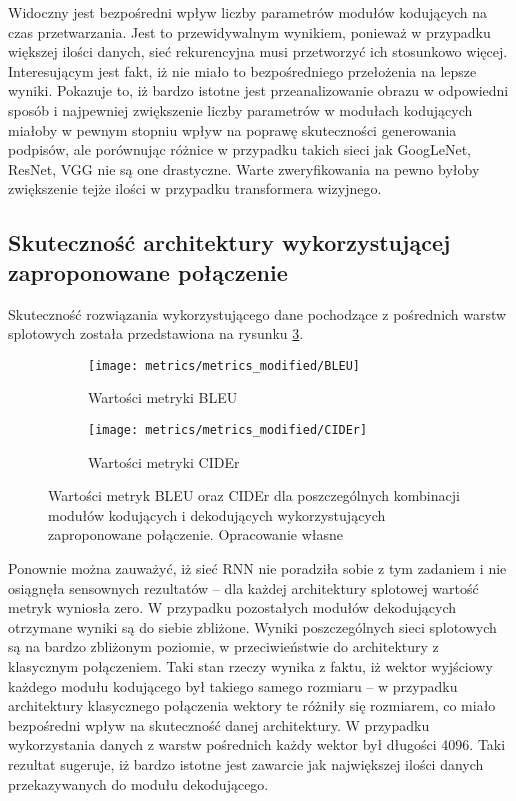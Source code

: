 \noindent Widoczny jest bezpośredni wpływ liczby parametrów modułów kodujących na czas przetwarzania. Jest to przewidywalnym wynikiem, ponieważ w przypadku większej ilości danych, sieć rekurencyjna musi przetworzyć ich stosunkowo więcej. Interesującym jest fakt, iż nie miało to bezpośredniego przełożenia na lepsze wyniki. Pokazuje to, iż bardzo istotne jest przeanalizowanie obrazu w odpowiedni sposób i najpewniej zwiększenie liczby parametrów w modułach kodujących miałoby w pewnym stopniu wpływ na poprawę skuteczności generowania podpisów, ale porównując różnice w przypadku takich sieci jak GoogLeNet, ResNet, VGG nie są one drastyczne. Warte zweryfikowania na pewno byłoby zwiększenie tejże ilości w przypadku transformera wizyjnego.
\subsection{Skuteczność architektury wykorzystującej zaproponowane połączenie}
Skuteczność rozwiązania wykorzystującego dane pochodzące z pośrednich warstw splotowych została przedstawiona na rysunku \ref{fig:metrics-modified}.
\begin{figure}[H]
    \centering
    \begin{subfigure}{.5\textwidth}
        \centering
        \texttt{[image: metrics/metrics\_modified/BLEU]}
        \caption{Wartości metryki BLEU}
        \label{fig:bleu-modified}
    \end{subfigure}%
    \centering
    \begin{subfigure}{.5\textwidth}
        \centering
        \texttt{[image: metrics/metrics\_modified/CIDEr]}
        \caption{Wartości metryki CIDEr}
        \label{fig:cider-modified}
    \end{subfigure}%
    \caption{Wartości metryk BLEU oraz CIDEr dla poszczególnych kombinacji modułów kodujących i dekodujących wykorzystujących zaproponowane połączenie. Opracowanie własne}
    \label{fig:metrics-modified}
\end{figure}
\noindent Ponownie można zauważyć, iż sieć RNN nie poradziła sobie z tym zadaniem i nie osiągnęła sensownych rezultatów -- dla każdej architektury splotowej wartość metryk wyniosła zero. W przypadku pozostałych modułów dekodujących otrzymane wyniki są do siebie zbliżone. Wyniki poszczególnych sieci splotowych są na bardzo zbliżonym poziomie, w przeciwieństwie do architektury z klasycznym połączeniem. Taki stan rzeczy wynika z faktu, iż wektor wyjściowy każdego modułu kodującego był takiego samego rozmiaru -- w przypadku architektury klasycznego połączenia wektory te różniły się rozmiarem, co miało bezpośredni wpływ na skuteczność danej architektury. W przypadku wykorzystania danych z warstw pośrednich każdy wektor był długości 4096. Taki rezultat sugeruje, iż bardzo istotne jest zawarcie jak największej ilości danych przekazywanych do modułu dekodującego.

